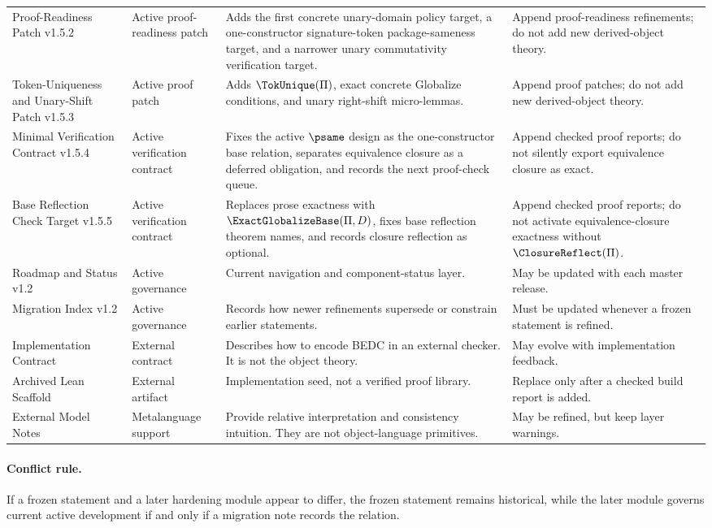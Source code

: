\begin{longtable}{p{}p{}p{}p{}}
Proof-Readiness Patch v1.5.2 & Active proof-readiness patch & Adds the first concrete unary-domain policy target, a one-constructor signature-token package-sameness target, and a narrower unary commutativity verification target. & Append proof-readiness refinements; do not add new derived-object theory.\\
Token-Uniqueness and Unary-Shift Patch v1.5.3 & Active proof patch & Adds \(\TokUnique(\Pi)\), exact concrete Globalize conditions, and unary right-shift micro-lemmas. & Append proof patches; do not add new derived-object theory.\\
Minimal Verification Contract v1.5.4 & Active verification contract & Fixes the active \(\psame\) design as the one-constructor base relation, separates equivalence closure as a deferred obligation, and records the next proof-check queue. & Append checked proof reports; do not silently export equivalence closure as exact.\\
Base Reflection Check Target v1.5.5 & Active verification contract & Replaces prose exactness with \(\ExactGlobalizeBase(\Pi,D)\), fixes base reflection theorem names, and records closure reflection as optional. & Append checked proof reports; do not activate equivalence-closure exactness without \(\ClosureReflect(\Pi)\).\\
Roadmap and Status v1.2 & Active governance & Current navigation and component-status layer. & May be updated with each master release.\\
Migration Index v1.2 & Active governance & Records how newer refinements supersede or constrain earlier statements. & Must be updated whenever a frozen statement is refined.\\
Implementation Contract & External contract & Describes how to encode BEDC in an external checker. It is not the object theory. & May evolve with implementation feedback.\\
Archived Lean Scaffold & External artifact & Implementation seed, not a verified proof library. & Replace only after a checked build report is added.\\
External Model Notes & Metalanguage support & Provide relative interpretation and consistency intuition. They are not object-language primitives. & May be refined, but keep layer warnings.\\
\bottomrule
\end{longtable}

\paragraph{Conflict rule.}
If a frozen statement and a later hardening module appear to differ, the frozen statement remains historical, while the later module governs current active development if and only if a migration note records the relation.

